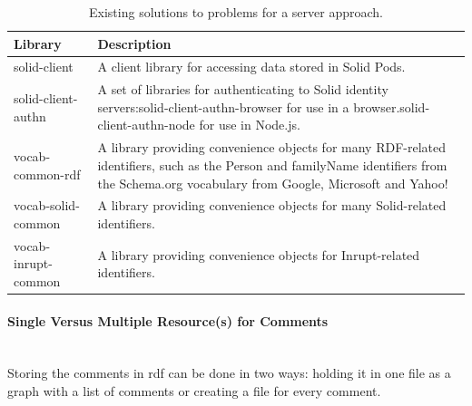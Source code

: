 \begin{table}[h!]
    \centering
    \begin{tabular}{| l | p{11cm} |} 
    \hline
     Library & Description \\
     \hline
      solid-client & A client library for accessing data stored in Solid Pods.  \\
      \hline
      solid-client-authn & A set of libraries for authenticating to Solid identity servers:solid-client-authn-browser for use in a browser.solid-client-authn-node for use in Node.js.  \\
      \hline
      vocab-common-rdf & A library providing convenience objects for many RDF-related identifiers, such as the Person and familyName identifiers from the Schema.org vocabulary from Google, Microsoft and Yahoo!  \\
      \hline
      vocab-solid-common & A library providing convenience objects for many Solid-related identifiers.  \\
      \hline
      vocab-inrupt-common & A library providing convenience objects for Inrupt-related identifiers.  \\
      \hline
    \end{tabular}
    \vspace{0.75cm}
    \caption{Existing solutions to problems for a server approach.}
    \label{table:4}
\end{table}
\vspace{0.5cm}
\paragraph{Single Versus Multiple Resource(s) for Comments}\mbox{}\\

Storing the comments in \gls{rdf} can be done in two ways: holding it in one file as a graph with a list of comments or creating a file for every comment.

